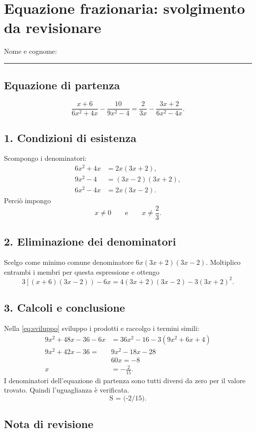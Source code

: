 \documentclass[a4paper,11pt]{article}
\begin{document}
\section*{Equazione frazionaria: svolgimento da revisionare}
Nome e cognome: \rule{8cm}{0.4pt}

\subsection*{Equazione di partenza}
\[
\frac{x+6}{6x^2+4x}-\frac{10}{9x^2-4}
=\frac{2}{3x}-\frac{3x+2}{6x^2-4x}.
\]

\subsection*{1. Condizioni di esistenza}
Scompongo i denominatori:
\begin{align*}
6x^2+4x &= 2x(3x+2),\\
9x^2-4  &= (3x-2)(3x+2),\\
6x^2-4x &= 2x(3x-2).
\end{align*}
Perciò impongo
\[
x\ne 0 \qquad \text{e} \qquad x\ne \frac{2}{3}.
\]

\subsection*{2. Eliminazione dei denominatori}
Scelgo come minimo comune denominatore \(6x(3x+2)(3x-2)\).
Moltiplico entrambi i membri per questa espressione e ottengo
\begin{equation}
3\left[(x+6)(3x-2)\right)-6x
=4(3x+2)(3x-2)-3(3x+2)^2.
\label{eq:senza-denominatori}
\end{equation}

\subsection*{3. Calcoli e conclusione}
Nella \eqref{eq:sviluppo} sviluppo i prodotti e raccolgo i termini simili:
\begin{align*}
9x^2+48x-36-6x &=36x^2-16-3(9x^2+6x+4)\\
9x^2+42x-36 ={}&9x^2-18x-28\\
&60x=-8\\
x&=-\frac{2}{15}.
\end{align*}
I denominatori dell'equazione di partenza sono tutti diversi da zero
per il valore trovato. Quindi l'uguaglianza è verificata.
\[
\text{S = (-2/15)}.
\]

\subsection*{Nota di revisione}
\end{document}
